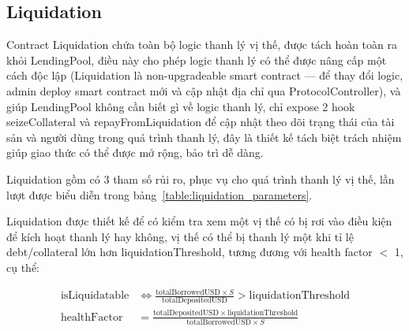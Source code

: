 \documentclass[../DoAn.tex]{subfiles}
\begin{document}
\subsection{Liquidation}
\label{section:4.2.3}


Contract Liquidation chứa toàn bộ logic thanh lý vị thế, được tách hoàn toàn ra khỏi LendingPool, điều này cho phép logic thanh lý có thể được nâng cấp một cách độc lập (Liquidation là non-upgradeable smart contract --- để thay đổi logic, admin deploy smart contract mới và cập nhật địa chỉ qua ProtocolController), và giúp LendingPool không cần biết gì về logic thanh lý, chỉ expose 2 hook seizeCollateral và repayFromLiquidation để cập nhật theo dõi trạng thái của tài sản và người dùng trong quá trình thanh lý, đây là thiết kế tách biệt trách nhiệm giúp giao thức có thể được mở rộng, bảo trì dễ dàng.

Liquidation gồm có 3 tham số rủi ro, phục vụ cho quá trình thanh lý vị thế, lần lượt được biểu diễn trong bảng~\ref{table:liquidation_parameters}.

\begin{table}[H]
\centering
{}
\caption{Các tham số rủi ro}
\label{table:liquidation_parameters}
\end{table}


Liquidation được thiết kế để có kiểm tra xem một vị thế có bị rơi vào điều kiện để kích hoạt thanh lý hay không, vị thế có thể bị thanh lý một khi tỉ lệ debt/collateral lớn hơn liquidationThreshold, tương đương với health factor $<$ 1, cụ thể:

\begin{align}
\mathrm{isLiquidatable} &\Leftrightarrow \frac{\mathrm{totalBorrowedUSD} \times S}{\mathrm{totalDepositedUSD}} > \mathrm{liquidationThreshold} \label{eq:is_liquidatable} \\
\mathrm{healthFactor} &= \frac{\mathrm{totalDepositedUSD} \times \mathrm{liquidationThreshold}}{\mathrm{totalBorrowedUSD} \times S} \label{eq:health_factor_calc}
\end{align}
\end{document}
